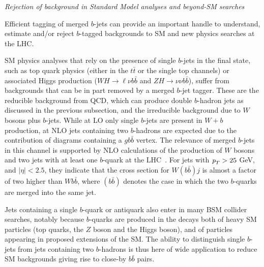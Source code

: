 {\em Rejection of background in Standard Model analyses and beyond-SM searches}

Efficient tagging of merged $b$-jets can provide an important handle to understand, estimate and/or reject $b$-tagged backgrounds to SM and new physics searches at the LHC.



SM physics analyses that rely on the presence of single $b$-jets in the final state, such as top quark physics (either in the $t\bar{t}$ or the single top channels) or associated Higgs production ($WH\rightarrow\ell\nu b\bar{b}$ and $ZH\rightarrow\nu\nu b\bar{b}$),  suffer from backgrounds that can be in part removed by a merged $b$-jet tagger. These are the reducible background from QCD, which can produce double $b$-hadron jets as discussed in the previous subsection, and the irreducible background due to $W$ bosons plus $b$-jets. 
While at LO only single $b$-jets are present in $W+b$ production, at NLO jets containing two $b$-hadrons are expected due to the contribution of diagrams containing a $gb\bar{b}$ vertex.
The relevance of merged $b$-jets in this channel is supported by NLO calculations of the production of $W$ bosons and two jets with at least one $b$-quark at the LHC~\cite{Campbell:2006}. For jets with ${\emph{p}_{T}} > 25$ GeV, and $|\eta| < 2.5$, they indicate that the cross section for $W(b\bar{b})j$ is almost a factor of two higher than $Wb\bar{b}$, where $(b\bar{b})$ denotes the case in which the two $b$-quarks are merged into the same jet. 

Jets containing a single $b$-quark or antiquark
also enter in many BSM collider searches, notably because $b$-quarks are produced in the decays both of heavy SM particles (top quarks, the $Z$ boson and the Higgs boson), and of particles appearing in proposed extensions of the SM. The ability to distinguish single $b$-jets from jets containing two $b$-hadrons is thus here of wide application to reduce SM backgrounds giving rise to close-by $b\bar{b}$ pairs.

